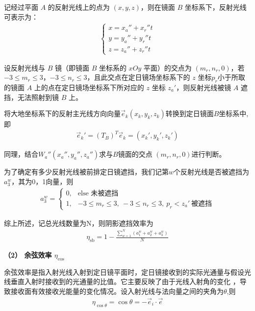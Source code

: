 \documentclass[../main.tex]{subfiles}
\begin{document}
 \par 记经过平面 $A$ 的反射光线上的点为 $(x, y, z)$，则在镜面 $B$ 坐标系下，反射光线可表示为：
\begin{align} \label{1.34}
 \begin{cases}
x = x_a'' + x_r'' t \\
y = y_a'' + y_r'' t \\
z = z_a'' + z_r'' t
\end{cases}
\end{align}
\par 设反射光线与 $B$ 镜（即镜面 $B$ 坐标系的 $xOy$ 平面）的交点为 $(m_r, n_r, 0)$，若 $-3 \leq m_r \leq 3$，$-3 \leq n_r \leq 3$，且此交点在定日镜场坐标系下的 $z$ 坐标$p_r$小于所取的镜面 $A$ 上的点在定日镜场坐标系下所对应的 $z$ 坐标 $z_a'$，则反射光线被镜 \( A \) 遮挡，无法照射到镜 \( B \) 上。
\par 将大地坐标系下的反射主光线方向向量$\vec{e}_k (x_k, y_k, z_k)$转换到定日镜面$B$坐标系中,即
\begin{align}    \label{1.32}
\vec{e}_k'=(T_B)^T\vec{e}_k=\left( x_k',y_k',z_k' \right) 
\end{align}
\par 同理，结合$ W_a''(x_a'', y_a'', z_a'')$求与$B$镜面的交点 $(m_r, n_r, 0)$进行判断。
\par 为了确定有多少反射光线被前排定日镜遮挡，我们记第$w$个反射光线是否被遮挡为$a_3^w$，其为0，1向量，则
\begin{align}    \label{1.33}
a_3^w = 
\begin{cases} 
0, & \text{else 未被遮挡} \\
1, & -3 \leq m_r \leq 3,\ -3 \leq n_r\leq 3,\ p_r < z_a'\ \text{被遮挡} 
\end{cases}
 \end{align}
\par 综上所述，记总光线数量为N，则阴影遮挡效率为
\begin{align}\label{1.34}
 \eta _{\text{sb}}=1-\frac{\sum_{w=1}^N{\left( a_{1}^{w}+a_{2}^{w}+a_{3}^{w} \right)}}{N}
\end{align}
\par \textbf{（2） 余弦效率 $\eta_{\text{cos}}$}
\par 余弦效率是指入射光线入射到定日镜平面时，定日镜接收到的实际光通量与假设光线垂直入射时接收到的光通量的比值。它主要反映了由于光线入射角的变化 ，导致接收面有效接收光能量的变化情况。设入射光线与法向量之间的夹角为$\theta $,则
\begin{align}\label{1.35}
  \eta_{\cos\theta} = \cos\theta = -\vec{e}_i \cdot \vec{e}
\end{align}
\end{document}
